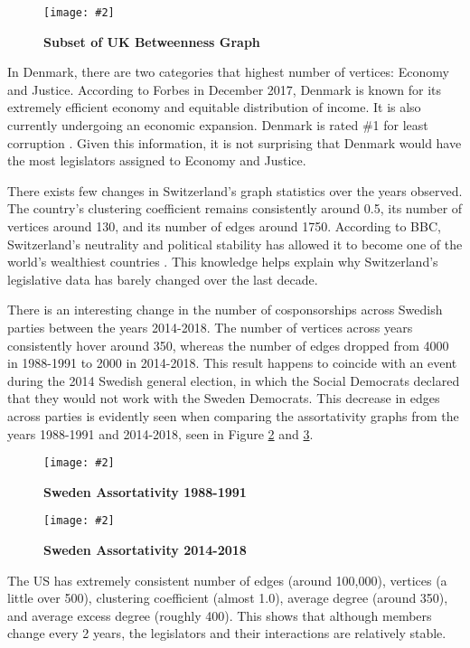 \documentclass[12pt]{article}
\newcommand{\image}[4][0.6]{
  \begin{figure}[H]
    \centering
    \texttt{[image: \#2]}
    \begin{center}
      \caption[(details)]{\textbf{#4}}
    \end{center}
    \label{fig:#3}
    \vspace{-2em}
  \end{figure}}
\begin{document}
\begin{multicols*}{2}
\begin{center}
  \image[0.2]{Images/uk-betweenness.png}{uk-betweenness}{Subset of UK Betweenness Graph}
\end{center}

In Denmark, there are two categories that highest number of vertices: Economy and Justice. According to Forbes in December 2017, Denmark is known for its extremely efficient economy and equitable distribution of income. It is also currently undergoing an economic expansion. Denmark is rated \#1 for least corruption \cite{denmark}. Given this information, it is not surprising that Denmark would have the most legislators assigned to Economy and Justice.

There exists few changes in Switzerland's graph statistics over the years observed. The country's clustering coefficient remains consistently around 0.5, its number of vertices around 130, and its number of edges around 1750. According to BBC, Switzerland's neutrality and political stability has allowed it to become one of the world's wealthiest countries \cite{switzerland}. This knowledge helps explain why Switzerland's legislative data has barely changed over the last decade.

There is an interesting change in the number of cosponsorships across Swedish parties between the years 2014-2018. The number of vertices across years consistently hover around 350, whereas the number of edges dropped from 4000 in 1988-1991 to 2000 in 2014-2018. This result happens to coincide with an event during the 2014 Swedish general election, in which the Social Democrats declared that they would not work with the Sweden Democrats. This decrease in edges across parties is evidently seen when comparing the assortativity graphs from the years 1988-1991 and 2014-2018, seen in Figure \ref{fig:swe_ass_1988} and \ref{fig:swe_ass_2014}.

\image[0.3]{../plots/graph/sweden/assortativity/assortativity_net_se1988-1991.pdf}{swe_ass_1988}{Sweden Assortativity 1988-1991}
\image[0.3]{../plots/graph/sweden/assortativity/assortativity_net_se2014-2018.pdf}{swe_ass_2014}{Sweden Assortativity 2014-2018}

The US has extremely consistent number of edges (around 100,000), vertices (a little over 500), clustering coefficient (almost 1.0), average degree (around 350), and average excess degree (roughly 400). This shows that although members change every 2 years, the legislators and their interactions are relatively stable. 


\end{multicols*}
\end{document}
